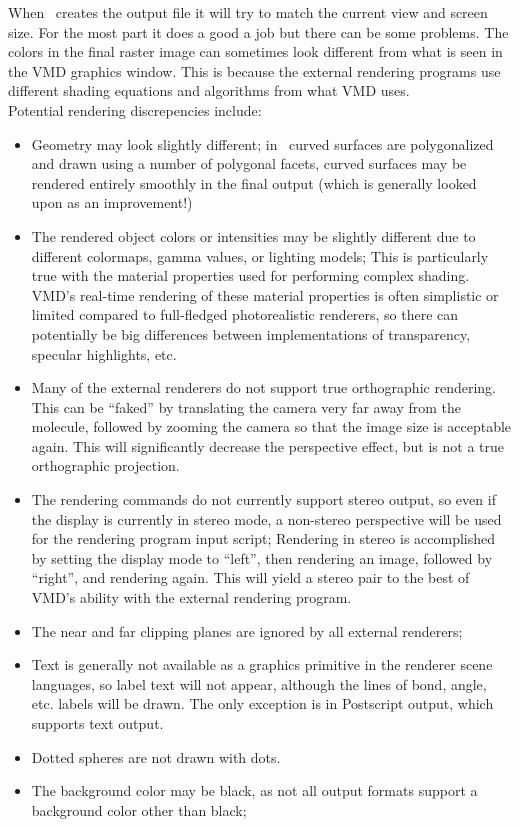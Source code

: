 When \VMD\ creates the output file it will try to match the current
view and screen size.  For the most part it does a good a job but
there can be some problems.  The colors in the final raster image can 
sometimes look different from what is seen in the VMD graphics window.
This is because the external rendering programs use different shading
equations and algorithms from what VMD uses.
\\
Potential rendering discrepencies include:
\begin{itemize}
  \item Geometry may look slightly different; 
        in \VMD\ curved surfaces are polygonalized and drawn using a
        number of polygonal facets, curved surfaces may be rendered entirely
        smoothly in the final output (which is generally looked upon as an
        improvement!)
  \item The rendered object colors or intensities may be slightly different
        due to different colormaps, gamma values, or lighting models;
        This is particularly true with the material properties used for
        performing complex shading.  VMD's real-time rendering of these
        material properties is often simplistic or limited compared to
        full-fledged photorealistic renderers, so there can potentially
        be big differences between implementations of transparency,
        specular highlights, etc.
  \item Many of the external renderers do not support true orthographic
        rendering.  This can be ``faked'' by translating the camera
        very far away from the molecule, followed by zooming the camera
        so that the image size is acceptable again.  This will significantly
        decrease the perspective effect, but is not a true orthographic
        projection.
  \item The rendering commands do not currently support stereo output,
        so even if the display is currently in stereo mode, a non-stereo
        perspective will be used for the rendering program input script;
        Rendering in stereo is accomplished by setting the display mode
        to ``left'', then rendering an image, followed by ``right'', and
        rendering again.  This will yield a stereo pair to the best of
        VMD's ability with the external rendering program.
  \item The near and far clipping planes are ignored by all external renderers;
  \item Text is generally not available as a graphics primitive in the
        renderer scene languages, so label text will not
        appear, although the lines of bond, angle, etc. labels will be
        drawn.  The only exception is in Postscript output, which supports
        text output.
  \item Dotted spheres are not drawn with dots.
  \item The background color may be black, as not all output formats support
        a background color other than black;
\end{itemize}


